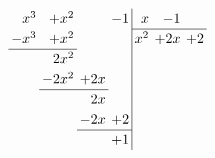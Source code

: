 \documentclass{article}
\begin{document}
\begin{equation}
    \renewcommand{\arraystretch}{1.2}
    \renewcommand{\arraycolsep}{2pt}
      \begin{array}{rrrr|rrr}
     x^3&+x^2 &   &-1&x  &-1 &  \\
    \cline{5-7}
    -x^3&+x^2 &   &  &x^2&+2x&+2\\
    \cline{1-2}
        &2x^2 &   &  &   &   &  \\
        &-2x^2&+2x&  &   &   &  \\
        \cline{2-3}
        &     &2x &  &   &   &  \\
        &     &-2x&+2&   &   &  \\
                  \cline{3-4}
        &     &   &+1&   &   &  \\
      \end{array}
    \end{equation}
\end{document}
